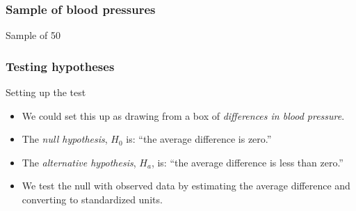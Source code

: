 \documentclass[handout]{beamer}
\begin{document}


   \begin{frame}
   \frametitle{Sample of blood pressures}
   \begin{center}
   \end{center}
   Sample of 50
   \end{frame}


   \begin{frame} \frametitle{Testing hypotheses}

   \begin{block}
   {Setting up the test}
   \begin{itemize}

   \item We could set this up as drawing from a box of {\em differences
   in blood pressure}.

   \item The {\em null hypothesis}, $H_0$ is: ``the average difference is zero.''

   \item The {\em alternative hypothesis}, $H_a$, is: ``the average difference is less than zero.''

   \item We test the null with observed data by estimating
    the average difference and converting to standardized units.
   \end{itemize}
   \end{block}
   \end{frame}
\end{document}
